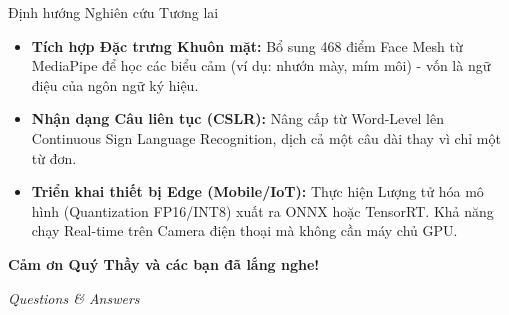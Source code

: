 \documentclass[aspectratio=169]{beamer}
\begin{document}
\begin{frame}{Định hướng Nghiên cứu Tương lai}
    \begin{itemize}
        \item \textbf{Tích hợp Đặc trưng Khuôn mặt:} Bổ sung 468 điểm Face Mesh từ MediaPipe để học các biểu cảm (ví dụ: nhướn mày, mím môi) - vốn là ngữ điệu của ngôn ngữ ký hiệu.
        \item \textbf{Nhận dạng Câu liên tục (CSLR):} Nâng cấp từ Word-Level lên Continuous Sign Language Recognition, dịch cả một câu dài thay vì chỉ một từ đơn.
        \item \textbf{Triển khai thiết bị Edge (Mobile/IoT):} Thực hiện Lượng tử hóa mô hình (Quantization FP16/INT8) xuất ra ONNX hoặc TensorRT. Khả năng chạy Real-time trên Camera điện thoại mà không cần máy chủ GPU.
    \end{itemize}
\end{frame}

\begin{frame}
    \centering
    \vspace{1cm}
    \LARGE \textbf{Cảm ơn Quý Thầy và các bạn đã lắng nghe!}
    \vspace{1.5cm}
    
    \large \textit{Questions \& Answers}
\end{frame}
\end{document}
